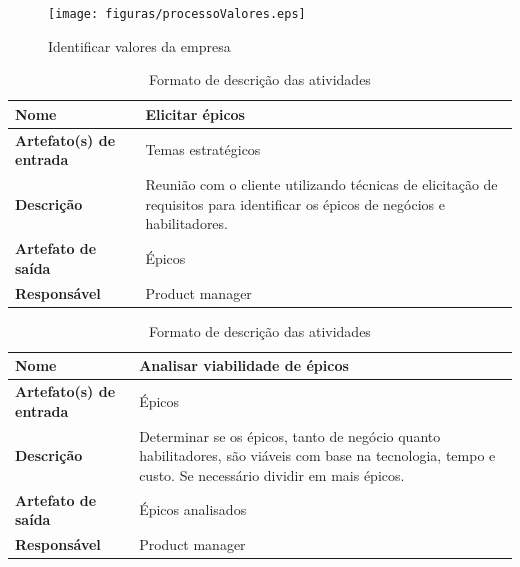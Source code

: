 \begin{figure}[H]
    \centering
    \caption{Identificar valores da empresa}
    \label{processoValores}
    \texttt{[image: figuras/processoValores.eps]}
\end{figure}

\begin{table}[h]
    \centering
    \label{descricaoAtividades}
    \caption{Formato de descrição das atividades}
        \begin{tabular}{|l|p{10cm}|}
        \hline
        \textbf{Nome} & Elicitar épicos \\
        \hline
        \textbf{Artefato(s) de entrada} & Temas estratégicos \\
        \hline
        \textbf{Descrição} & Reunião com o cliente utilizando técnicas de elicitação de requisitos para identificar os épicos de negócios e habilitadores. \\
        \hline
        \textbf{Artefato de saída} & Épicos \\
        \hline
        \textbf{Responsável} & Product manager \\
        \hline
    \end{tabular}
\end{table}

\begin{table}[h]
    \centering
    \label{descricaoAtividades}
    \caption{Formato de descrição das atividades}
        \begin{tabular}{|l|p{10cm}|}
        \hline
        \textbf{Nome} & Analisar viabilidade de épicos \\
        \hline
        \textbf{Artefato(s) de entrada} & Épicos \\
        \hline
        \textbf{Descrição} & Determinar se os épicos, tanto de negócio quanto habilitadores, são viáveis com base na tecnologia, tempo e custo. Se necessário dividir em mais épicos. \\
        \hline
        \textbf{Artefato de saída} & Épicos analisados \\
        \hline
        \textbf{Responsável} & Product manager \\
        \hline
    \end{tabular}
\end{table}

